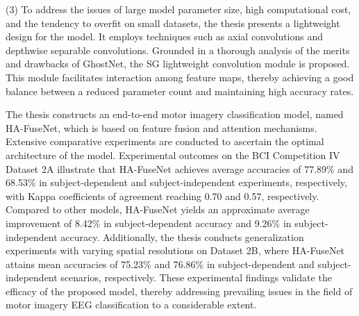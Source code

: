 (3) To address the issues of large model parameter size, high computational cost, and the tendency to overfit on small datasets, the thesis presents a lightweight design for the model. It employs techniques such as axial convolutions and depthwise separable convolutions. Grounded in a thorough analysis of the merits and drawbacks of GhostNet, the SG lightweight convolution module is proposed. This module facilitates interaction among feature maps, thereby achieving a good balance between a reduced parameter count and maintaining high accuracy rates.

The thesis constructs an end-to-end motor imagery classification model, named HA-FuseNet, which is based on feature fusion and attention mechanisms. Extensive comparative experiments are conducted to ascertain the optimal architecture of the model. Experimental outcomes on the BCI Competition IV Dataset 2A illustrate that HA-FuseNet achieves average accuracies of 77.89\% and 68.53\% in subject-dependent and subject-independent experiments, respectively, with Kappa coefficients of agreement reaching 0.70 and 0.57, respectively. Compared to other models, HA-FuseNet yields an approximate average improvement of 8.42\% in subject-dependent accuracy and 9.26\% in subject-independent accuracy. Additionally, the thesis conducts generalization experiments with varying spatial resolutions on Dataset 2B, where HA-FuseNet attains mean accuracies of 75.23\% and 76.86\% in subject-dependent and subject-independent scenarios, respectively. These experimental findings validate the efficacy of the proposed model, thereby addressing prevailing issues in the field of motor imagery EEG classification to a considerable extent.